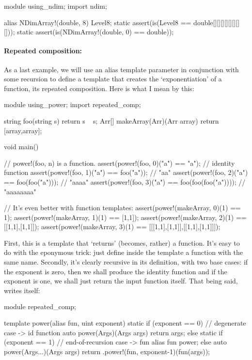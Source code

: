 \begin{dcode}
module using_ndim;
import ndim;

alias NDimArray!(double, 8) Level8;
static assert(is(Level8 == double[][][][][][][][]));
static assert(is(NDimArray!(double, 0) == double));
\end{dcode}

\paragraph{Repeated composition:} 

As a last example, we will use an alias template parameter in conjunction with some  recursion to define a template that creates the `exponentiation' of a function, its repeated composition. Here is what I mean by this:

\begin{dcode}
module using_power;
import repeated_comp;

string foo(string s) { return s ~ s;}
Arr[] makeArray(Arr)(Arr array) { return [array,array];}

void main()
{
   // power!(foo, n) is a function.
   assert(power!(foo, 0)("a") == "a");                // identity function
   assert(power!(foo, 1)("a") == foo("a"));           // "aa"
   assert(power!(foo, 2)("a") == foo(foo("a")));      // "aaaa"
   assert(power!(foo, 3)("a") == foo(foo(foo("a")))); // "aaaaaaaa"
	
   // It's even better with function templates:
   assert(power!(makeArray, 0)(1) == 1);
   assert(power!(makeArray, 1)(1) == [1,1]);
   assert(power!(makeArray, 2)(1) == [[1,1],[1,1]]);
   assert(power!(makeArray, 3)(1) == [[[1,1],[1,1]],[[1,1],[1,1]]]);
}
\end{dcode}

First, this is a template that `returns' (becomes, rather) a function. It's easy to do with the eponymous trick: just define inside the template a function with the same name. Secondly, it's clearly recursive in its definition, with two base cases: if the exponent is zero, then we shall produce the identity function and if the exponent is one, we shall just return the input function itself. That being said,  writes itself:

\begin{ndcode}
module repeated_comp;

template power(alias fun, uint exponent)
{
    static if (exponent == 0) // degenerate case -> id function
        auto power(Args)(Args args) { return args; }
    else static if (exponent == 1) // end-of-recursion case -> fun
        alias fun power;
    else
        auto power(Args...)(Args args) 
        {
            return .power!(fun, exponent-1)(fun(args));
        }
}
\end{ndcode}

